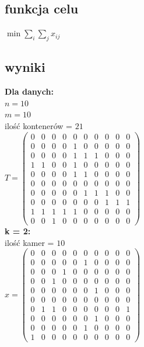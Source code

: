 \documentclass{report}
\begin{document}
\subsection*{funkcja celu}
$\min \sum_{i}\sum_{j}x_{ij}$
\subsection*{wyniki}
\textbf{Dla danych:}\\
$n = 10$\\
$m = 10$\\
ilość kontenerów = $21$\\
$T = \begin{pmatrix}
    0 & 0 & 0 & 0 & 0 & 0 & 0 & 0 & 0 & 0 \\
    0 & 0 & 0 & 0 & 1 & 0 & 0 & 0 & 0 & 0 \\
    0 & 0 & 0 & 0 & 1 & 1 & 1 & 0 & 0 & 0 \\
    1 & 1 & 0 & 0 & 1 & 0 & 0 & 0 & 0 & 0 \\
    0 & 0 & 0 & 0 & 1 & 1 & 0 & 0 & 0 & 0 \\
    0 & 0 & 0 & 0 & 0 & 0 & 0 & 0 & 0 & 0 \\
    0 & 0 & 0 & 0 & 0 & 1 & 1 & 1 & 0 & 0 \\
    0 & 0 & 0 & 0 & 0 & 0 & 0 & 1 & 1 & 1 \\
    1 & 1 & 1 & 1 & 1 & 0 & 0 & 0 & 0 & 0 \\
    0 & 0 & 1 & 0 & 0 & 0 & 0 & 0 & 0 & 0
    \end{pmatrix}$\\    
\textbf{k = 2:}\\
ilość kamer = $10$\\
$x = \begin{pmatrix}
    0 & 0 & 0 & 0 & 0 & 0 & 0 & 0 & 0 & 0 \\
    0 & 0 & 0 & 0 & 0 & 1 & 0 & 0 & 0 & 0 \\
    0 & 0 & 0 & 1 & 0 & 0 & 0 & 0 & 0 & 0 \\
    0 & 0 & 1 & 0 & 0 & 0 & 0 & 0 & 0 & 0 \\
    0 & 0 & 0 & 0 & 0 & 0 & 1 & 0 & 0 & 0 \\
    0 & 0 & 0 & 0 & 0 & 0 & 0 & 0 & 0 & 0 \\
    0 & 1 & 1 & 0 & 0 & 0 & 0 & 0 & 0 & 1 \\
    0 & 0 & 0 & 0 & 0 & 0 & 1 & 0 & 0 & 0 \\
    0 & 0 & 0 & 0 & 0 & 1 & 0 & 0 & 0 & 0 \\
    1 & 0 & 0 & 0 & 0 & 0 & 0 & 0 & 0 & 0
    \end{pmatrix}$\\
\end{document}
